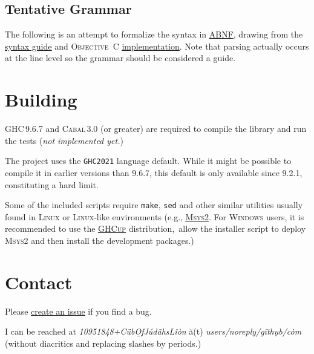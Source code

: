 \documentclass[11pt]{article}
\newcommand{\link}[2]{\underline{\color{darkblue}\href{#1}{#2}}}
\begin{document}
  \subsection*{Tentative Grammar}
    The following is an attempt to formalize the syntax in
    \link{https://datatracker.ietf.org/doc/html/rfc5234}{\textsc{ABNF}},
    drawing from the \link{https://fountain.io/syntax/}{syntax guide}
    and \textsc{Objective~C}
    \link{https://github.com/nyousefi/Fountain}{implementation}. Note
    that parsing actually occurs at the line level so the grammar
    should be considered a guide.

    

\section*{Building}
\textsc{GHC}\,9.6.7 and \textsc{Cabal}\,3.0 (or greater) are required to
compile the library and run the tests ({\em not implemented yet.})

The project uses the \texttt{GHC2021} language default. While it might
be possible to compile it in earlier versions than 9.6.7, this default
is only available since 9.2.1, constituting a hard limit.

Some of the included scripts require \texttt{make}, \texttt{sed} and
other similar utilities usually found in \textsc{Linux} or
\textsc{Linux}-like environments (e.g.,
\link{https://www.msys2.org/}{\textsc{Msys2}}\@. For \textsc{Windows}
users, it is recommended to use the
\link{https://www.haskell.org/ghcup/}{\textsc{GHCup}} distribution,\
allow the installer script to deploy \textsc{Msys2} and then install
the development packages.)

\section*{Contact}
Please
\link{https://github.com/CubOfJudahsLion/fountain-parser/issues}{create an issue}
if you find a bug.

I can be reached at
\textrm{\emph{10951848+C\"{u}b\b{O}fJ\'{u}d\~{a}hsL\^{i}\`{o}n} \u{a}(t)
\emph{users/noreply/g\={i}th\d{u}b/c\.{o}m}} (without diacritics and
replacing slashes by periods.)
\end{document}
